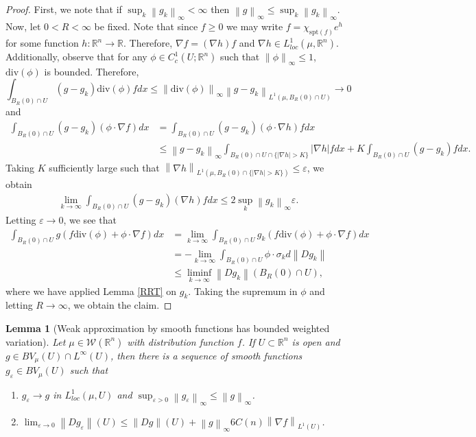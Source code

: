 \documentclass[12pt]{amsart}
\numberwithin{equation}{section}
\theoremstyle{plain}
\newtheorem{lemma}[theorem]{Lemma}
\theoremstyle{definition}
\newcommand{\norm}[1]{\left\lVert#1\right\rVert}
\begin{document}
\begin{proof}
First, we note that if $\sup_k \norm{g_k}_{\infty}< \infty$ then $\norm{g}_{\infty} \le \sup_k \norm{g_k}_{\infty}$. Now, let $0<R<\infty$ be fixed.  Note that since $f \ge 0$ we may write $f = \chi_{\text{spt}(f)}e^h$ for some function $h: \mathbb{R}^n \rightarrow \mathbb{R}$. Therefore, $\nabla f = (\nabla h) f$ and $\nabla h\in L^1_{loc}(\mu, \mathbb{R}^n)$.  Additionally, observe that for any $\phi \in C^1_c(U; \mathbb{R}^n)$ such that $\norm{\phi}_{\infty} \le 1$, $\text{div}(\phi)$ is bounded. Therefore,
$$\int_{B_R(0) \cap U} (g-g_k)\text{div}(\phi)fdx \le \norm{\text{div}(\phi)}_{\infty}\norm{g-g_k}_{L^1(\mu, B_R(0) \cap U)} \rightarrow 0$$
and
\begin{align*}
    \int_{B_R(0)\cap U} (g-g_k)(\phi \cdot \nabla f)dx & = \int_{B_R(0)\cap U} (g-g_k)(\phi \cdot \nabla h)fdx\\
    &
\le \norm{g-g_k}_{\infty}\int_{B_R(0) \cap U \cap \{|\nabla h|>K\}}|\nabla{h}|fdx + K \int_{B_R(0)\cap U}(g-g_k)fdx.
\end{align*}
Taking $K$ sufficiently large such that $\norm{\nabla h}_{L^1(\mu, B_R(0) \cap \{|\nabla h|>K\})} \le \varepsilon$, we obtain
\begin{align*}
    \lim_{k \rightarrow \infty} \int_{B_R(0) \cap U} (g-g_k)(\nabla h)fdx \le 2\sup_k \norm{g_k}_{\infty} \varepsilon.
\end{align*}
Letting $\varepsilon \rightarrow 0$, we see that 
\begin{align*}
    \int_{B_R(0) \cap U}g(f\text{div}(\phi) + \phi \cdot \nabla f)dx & = \lim_{k \rightarrow \infty} \int_{B_R(0) \cap U}g_k(f\text{div}(\phi) + \phi \cdot \nabla f )dx\\
    & = -\lim_{k \rightarrow \infty} \int_{B_R(0) \cap U}\phi \cdot \sigma_k d\norm{Dg_k} \\
    & \le \liminf_{k \rightarrow \infty} \norm{Dg_k}(B_{R}(0) \cap U),
\end{align*}
where we have applied Lemma \ref{RRT} on $g_k$. Taking the supremum in $\phi$ and letting $R \rightarrow \infty$, we obtain the claim.
\end{proof}

\begin{lemma}[Weak approximation by smooth functions has bounded weighted variation]\label{l:weak approx by smooth} Let $\mu \in \mathscr{W}(\mathbb{R}^n)$ with distribution function $f$.  If $U \subset \mathbb{R}^n$ is open and $g \in BV_{\mu}(U) \cap L^\infty(U)$, then there is a sequence of smooth functions $g_\varepsilon \in BV_{\mu}(U)$ such that 
    \begin{enumerate}
        \item $g_\varepsilon \rightarrow g$ in $L^1_{loc}(\mu, U)$ and $\sup_{\varepsilon>0}\norm{g_\varepsilon}_{\infty} \le \norm{g}_{\infty}$.
        \item $\lim_{\varepsilon \rightarrow 0}\norm{Dg_\varepsilon}(U) \le \norm{Dg}(U) + \norm{g}_{\infty}6C(n)\norm{\nabla f}_{L^1(U)}$.
    \end{enumerate}
\end{lemma}
\end{document}
